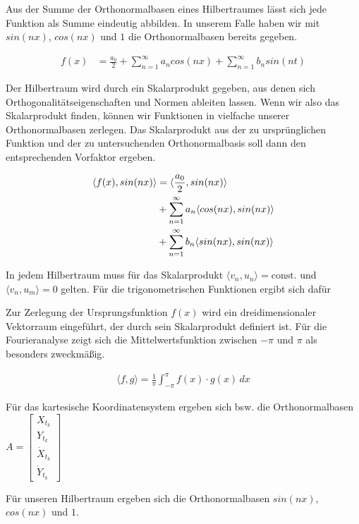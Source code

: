 Aus der Summe der Orthonormalbasen eines Hilbertraumes lässt sich jede Funktion als Summe eindeutig abbilden. In unserem Falle haben wir mit $ sin(n x)$, $cos(n x)$ und $1$ die Orthonormalbasen bereits gegeben.

\begin{align}
  f(x) &= \frac{a_0}{2} + \sum_{n = 1}^{\infty} a_n cos(n x) + \sum_{n = 1}^{\infty} b_n sin(n t)
\end{align}

Der Hilbertraum wird durch ein Skalarprodukt gegeben, aus denen sich Orthogonalitätseigenschaften und Normen ableiten lassen. Wenn wir also das Skalarprodukt finden, können wir Funktionen in vielfache unserer Orthonormalbasen zerlegen. Das Skalarprodukt aus der zu ursprünglichen Funktion und der zu untersuchenden Orthonormalbasis soll dann den entsprechenden Vorfaktor ergeben.

\begin{align}
  \langle f(x), sin(n x) \rangle &= \langle \frac{a_0}{2}, sin(n x) \rangle \notag\\
  &+ \sum_{n = 1}^{\infty} a_n \langle cos(n x), sin(n x) \rangle \notag \\
  &+ \sum_{n = 1}^{\infty} b_n \langle sin(n x), sin(n x) \rangle
\end{align}

In jedem Hilbertraum muss für das Skalarprodukt $\langle v_n, u_n \rangle = \text{const.} $ und $\langle v_n, u_m \rangle = 0$ gelten. Für die trigonometrischen Funktionen ergibt sich dafür

Zur Zerlegung der Ursprungsfunktion $f(x)$ wird ein dreidimensionaler Vektorraum eingeführt, der durch sein Skalarprodukt definiert ist. Für die Fourieranalyse zeigt sich die Mittelwertsfunktion zwischen $- \pi$ und $\pi$ als besonders zweckmä\ss ig.

\begin{align}
  \langle f, g \rangle = \frac{1}{\pi} \int_{-\pi}^{\pi} f(x) \cdot g(x) \, dx
\end{align}



Für das kartesische Koordinatensystem ergeben sich bsw. die Orthonormalbasen $ A=\begin{bmatrix}
         X_{t_{k}} \\
         Y_{t_{k}} \\
         \dot{X}_{t_{k}}\\
         \dot{Y}_{t_{k}}
        \end{bmatrix} $

Für unseren Hilbertraum ergeben sich die Orthonormalbasen $ sin(n x)$, $cos(n x)$ und $1$.
